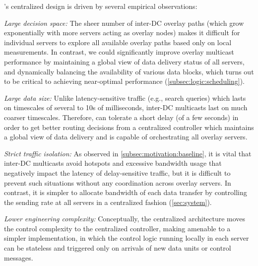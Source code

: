 \name's centralized design is driven by several empirical observations:
\begin{packedenumerate}

\item {\em Large decision space:}
The sheer number of inter-DC overlay paths (which grow exponentially
with more servers acting as overlay nodes) makes it difficult for 
individual servers to explore all available overlay paths based only 
on local measurements. In contrast, we could significantly improve 
overlay multicast performance by maintaining a global view of data 
delivery status of all servers, and dynamically balancing the 
availability of various data blocks, which turns out to be critical 
to achieving near-optimal performance 
(\Section\ref{subsec:logic:scheduling}).

\item {\em Large data size:}
Unlike latency-sensitive traffic (e.g., search queries) which lasts 
on timescales of several to 10s of milliseconds, inter-DC multicasts 
last on much coarser timescales.
Therefore, \name can tolerate a short delay (of a few seconds) in order
to get better routing decisions from a centralized controller which 
maintains a global view of data delivery and is capable of orchestrating
all overlay servers.

\item {\em Strict traffic isolation:}
As observed in \Section\ref{subsec:motivation:baseline}, it is vital 
that inter-DC multicasts avoid hotspots and excessive bandwidth usage 
that negatively impact the latency of delay-sensitive traffic, but 
it is difficult to prevent such situations without any coordination 
across overlay servers. In contrast, it is simpler to 
allocate bandwidth of each data transfer by controlling the 
sending rate at all servers in a centralized fashion 
(\Section\ref{sec:system}).

\item {\em Lower engineering complexity:}
Conceptually, the centralized architecture moves the control 
complexity to the centralized controller, making \name amenable to a
simpler implementation, in which the control logic running locally in
each server can be stateless and triggered only on arrivals of new 
data units or control messages.

\end{packedenumerate}

